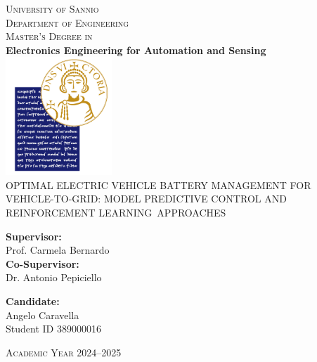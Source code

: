 \documentclass[a4paper,12pt]{report}
\begin{document}
  

\begin{titlepage}
    \begin{center}
    \large
        \textsc{\LARGE University of Sannio}\\[1cm]
        \textsc{Department of Engineering}\\[0.8cm]
        \textsc{Master’s Degree in}\\[0.6cm]
        \textbf{Electronics Engineering for Automation and Sensing}\\[1cm]
        
        \includegraphics[width=0.3\textwidth]{Logo.png}\\[1cm]
        
        {\Huge
             OPTIMAL ELECTRIC VEHICLE BATTERY MANAGEMENT FOR VEHICLE-TO-GRID: MODEL PREDICTIVE CONTROL AND REINFORCEMENT LEARNING APPROACHES    
}\\[2cm]
        
        \begin{minipage}{0.45\textwidth}
    \raggedright
    \textbf{Supervisor:}\\
    Prof. Carmela Bernardo \\[0.8cm]
    \textbf{Co-Supervisor:}\\
    Dr. Antonio Pepiciello 
\end{minipage}
\hfill
\begin{minipage}{0.45\textwidth}
    \raggedleft
    \textbf{Candidate:}\\
    Angelo Caravella
    \\
     Student ID 389000016
\end{minipage}

\vspace{0.5cm}
        \textsc{Academic Year 2024--2025}
    \end{center}
\end{titlepage}
\end{document}
